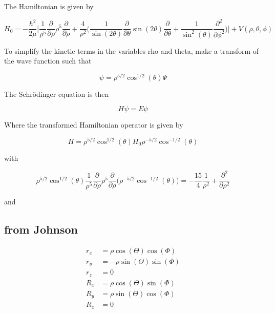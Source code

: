 \documentclass{article}
\begin{document}
The Hamiltonian is given by 

\begin{equation}
H_{0} = -\frac{\hbar^{2}}{2 \mu} \Bigg[ \frac{1}{\rho^{5}} \frac{\partial}{\partial \rho} \rho^{5} \frac{\partial}{\partial \rho} + \frac{4}{\rho^{2}}\Big( \frac{1}{\sin(2\theta)} \frac{\partial}{\partial \theta} \sin(2\theta) \frac{\partial}{\partial \theta} + \frac{1}{\sin^{2}(\theta)} \frac{\partial^{2}}{\partial \phi^{2}} \Big) \Bigg] + V(\rho, \theta, \phi)
\end{equation}

To simplify the kinetic terms in the variables rho and theta, make a transform of the wave function such that

\begin{equation}
\psi = \rho^{5/2} \cos^{1/2}(\theta) \Psi
\end{equation}

The Schr{\"o}dinger equation is then

\begin{equation}
H \psi = E \psi 
\end{equation}

Where the transformed Hamiltonian operator is given by

\begin{equation}
H = \rho^{5/2} \cos^{1/2}{(\theta)} H_{0} \rho^{-5/2} \cos^{-1/2}{(\theta)}
\end{equation}

with

\begin{equation}
\rho^{5/2} \cos^{1/2}{(\theta)} \frac{1}{\rho^{5}} \frac{\partial}{\partial \rho} \rho^{5} \frac{\partial}{\partial \rho} \Big( \rho^{-5/2} \cos^{-1/2}{(\theta)} \Big) = -\frac{15}{4} \frac{1}{\rho^{2}} + \frac{\partial^{2}}{\partial \rho^{2}}
\end{equation}

and

\subsection{from Johnson}

\begin{subequations}
\begin{align*}
	r_x &= \rho \cos(\Theta)\cos(\Phi)\\
	r_y &= -\rho \sin(\Theta)\sin(\Phi)\\
	r_z &= 0\\
	R_x &= \rho \cos(\Theta)\sin(\Phi)\\
	R_y &= \rho \sin(\Theta)\cos(\Phi)\\
	R_z &= 0
\end{align*}   
\end{subequations} 
\end{document}
